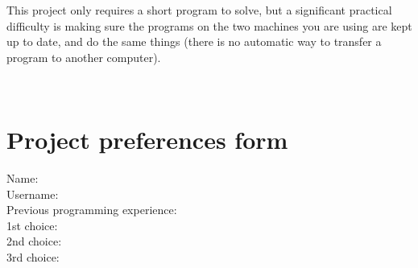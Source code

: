 \documentclass[12pt,a4paper,twoside]{article}
\renewcommand{\_}{\texttt{\symbol{95}}}
\begin{document}
This project only requires a short program to solve, but a significant
practical difficulty is making sure the programs on the two machines
you are using are kept up to date, and do the same things (there is
no automatic way to transfer a program to another computer).

\newpage
\ 
\newpage
\section{Project preferences form}

{\Large
Name:\\[1mm]

Username:\\[1mm]

Previous programming experience:\\[10mm]

1st choice:\\[1mm]

2nd choice:\\[1mm]

3rd choice:\\[1mm]
}
\end{document}
